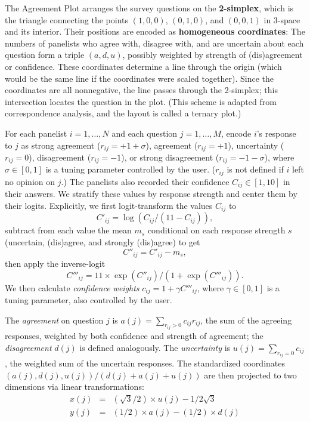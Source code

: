 \documentclass{article}
\begin{document}
The Agreement Plot arranges the survey questions on the {\bf 2-simplex}, which is the triangle connecting the points \((1,0,0)\), \((0,1,0)\), and \((0,0,1)\) in 3-space and its interior. Their positions are encoded as {\bf homogeneous coordinates}: The numbers of panelists who agree with, disagree with, and are uncertain about each question form a triple \((a,d,u)\), possibly weighted by strength of (dis)agreement or confidence. These coordinates determine a line through the origin (which would be the same line if the coordinates were scaled together). Since the coordinates are all nonnegative, the line passes through the 2-simplex; this intersection locates the question in the plot. (This scheme is adapted from correspondence analysis, and the layout is called a ternary plot.)

For each panelist \(i=1,\ldots,N\) and each question \(j=1,\ldots,M\), encode \(i\)'s response to \(j\) as strong agreement (\(r_{ij}=+1+\sigma\)), agreement (\(r_{ij}=+1\)), uncertainty (\(r_{ij}=0\)), disagreement (\(r_{ij}=-1\)), or strong disagreement (\(r_{ij}=-1-\sigma\)), where \(\sigma\in[0,1]\) is a tuning parameter controlled by the user. (\(r_{ij}\) is not defined if \(i\) left no opinion on \(j\).) The panelists also recorded their confidence \(C_{ij}\in[1,10]\) in their answers. We stratify these values by response strength and center them by their logits. Explicitly, we first logit-transform the values \(C_{ij}\) to
\[C'_{ij}=\log({C_{ij}}/{(11-C_{ij})}),\]
subtract from each value the mean \(m_s\) conditional on each response strength \(s\) (uncertain, (dis)agree, and strongly (dis)agree) to get
\[C''_{ij}=C'_{ij}-m_s,\]
then apply the inverse-logit 
\[C'''_{ij}=11\times\exp(C''_{ij})/(1+\exp(C'''_{ij})).\]
We then calculate {\em confidence weights} \(c_{ij}=1+\gamma C'''_{ij}\), where \(\gamma\in[0,1]\) is a tuning parameter, also controlled by the user.

The {\em agreement} on question \(j\) is \(a(j)=\sum_{r_{ij}>0}{c_{ij}r_{ij}}\), the sum of the agreeing responses, weighted by both confidence and strength of agreement; the {\em disagreement} \(d(j)\) is defined analogously. The {\em uncertainty} is \(u(j)=\sum_{r_{ij}=0}{c_{ij}}\), the weighted sum of the uncertain responses. The standardized coordinates \((a(j),d(j),u(j))/(d(j)+a(j)+u(j))\) are then projected to two dimensions via linear transformations:
\begin{eqnarray*}
x(j) &= &({\sqrt{3}}/{2})\times u(j) - {1}/{2\sqrt{3}} \\
y(j) &= &({1}/{2})\times a(j) - ({1}/{2})\times d(j)
\end{eqnarray*}
\end{document}
